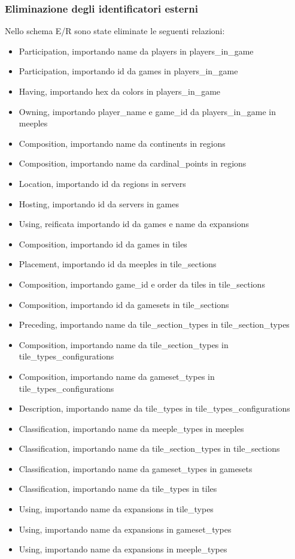 \subsubsection*{Eliminazione degli identificatori esterni}
Nello schema E/R sono state eliminate le seguenti relazioni:
\begin{itemize}
    \item Participation, importando name da players in players\_in\_game
    \item Participation, importando id da games in players\_in\_game
    \item Having, importando hex da colors in players\_in\_game
    \item Owning, importando player\_name e game\_id da players\_in\_game in meeples
    \item Composition, importando name da continents in regions
    \item Composition, importando name da cardinal\_points in regions
    \item Location, importando id da regions in servers
    \item Hosting, importando id da servers in games
    \item Using, reificata importando id da games e name da expansions
    \item Composition, importando id da games in tiles
    \item Placement, importando id da meeples in tile\_sections
    \item Composition, importando game\_id e order da tiles in tile\_sections
    \item Composition, importando id da gamesets in tile\_sections
    \item Preceding, importando name da tile\_section\_types in tile\_section\_types
    \item Composition, importando name da tile\_section\_types in tile\_types\_configurations
    \item Composition, importando name da gameset\_types in tile\_types\_configurations
    \item Description, importando name da tile\_types in tile\_types\_configurations
    \item Classification, importando name da meeple\_types in meeples
    \item Classification, importando name da tile\_section\_types in tile\_sections
    \item Classification, importando name da gameset\_types in gamesets
    \item Classification, importando name da tile\_types in tiles
    \item Using, importando name da expansions in tile\_types
    \item Using, importando name da expansions in gameset\_types
    \item Using, importando name da expansions in meeple\_types
\end{itemize}

